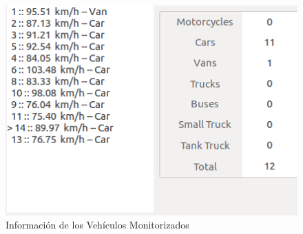    \begin{figure}[H] 
    \begin{center}
    	\includegraphics[scale=0.6]{figures/Diseno_global/info.png}
       \caption{Información de los Vehículos Monitorizados}
    	\label{fig.info_vehicles}
    \end{center}
    \end{figure}
    



